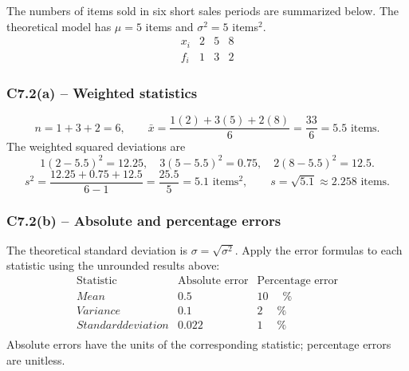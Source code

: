 {
The numbers of items sold in six short sales periods are summarized below.
The theoretical model has $\mu=5$ items and $\sigma^2=5$ items$^2$.
\[
\begin{array}{c|rrr}x_i&2&5&8\\\hline f_i&1&3&2\end{array}
\]
\label{sol:c7-2a}
\subsubsection*{C7.2(a) -- Weighted statistics }
\[
 n=1+3+2=6,\qquad\bar{x}=\frac{1(2)+3(5)+2(8)}{6}
 =\frac{33}{6}=5.5\text{ items}.
\]
The weighted squared deviations are
\[
1(2-5.5)^2=12.25,\quad 3(5-5.5)^2=0.75,\quad
2(8-5.5)^2=12.5.
\]
\[
s^2=\frac{12.25+0.75+12.5}{6-1}=\frac{25.5}{5}=5.1\text{ items}^2,
\qquad s=\sqrt{5.1}\approx2.258\text{ items}.
\]
\label{sol:c7-2b}
\subsubsection*{C7.2(b) -- Absolute and percentage errors }
The theoretical standard deviation is $\sigma=\sqrt{\sigma^2}$.
Apply the error formulas to each statistic using the unrounded results above:
\[
\begin{array}{l|rr}
\text{Statistic}&\text{Absolute error}&\text{Percentage error}\\\hline
Mean&0.5\phantom{00}&10\phantom{.00}\%\\
Variance&0.1\phantom{00}&2\phantom{.00}\%\\
Standard deviation&0.022&1\phantom{.00}\%\\
\end{array}
\]
Absolute errors have the units of the corresponding statistic; percentage errors are unitless.
\secInicio[sec:c7-2]
}

